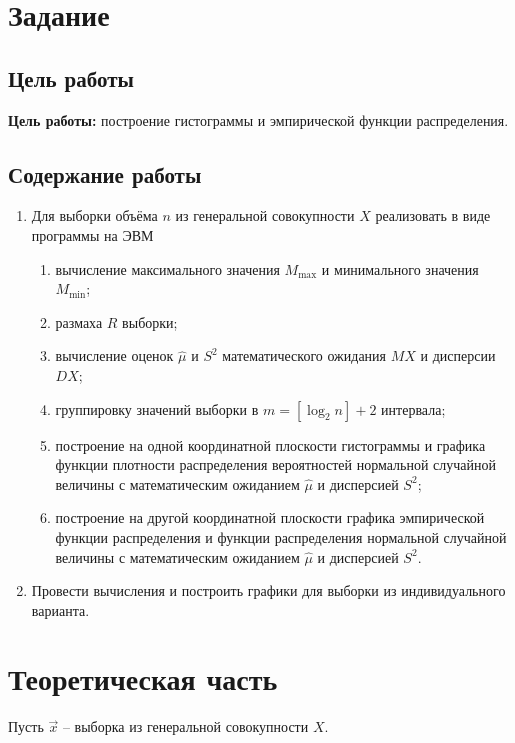 \documentclass[12pt]{report}
\begin{document}
	

	\chapter{Задание}

	\section{Цель работы}

	\textbf{Цель работы:} построение гистограммы и эмпирической функции распределения.

	\section{Содержание работы}

	\begin{enumerate}
		\item Для выборки объёма $n$ из генеральной совокупности $X$ реализовать в виде программы на ЭВМ
			\begin{enumerate}
				\item вычисление максимального значения $M_{\max}$ и минимального значения $M_{\min}$;
				\item размаха $R$ выборки;
				\item вычисление оценок $\hat\mu$ и $S^2$ математического ожидания $MX$ и дисперсии $DX$;
				\item группировку значений выборки в $m = [\log_2 n] + 2$ интервала;
				\item построение на одной координатной плоскости гистограммы и графика функции плотности распределения вероятностей нормальной случайной величины с математическим ожиданием $\hat{\mu}$ и дисперсией $S^2$;
				\item построение на другой координатной плоскости графика эмпирической функции распределения и функции распределения нормальной случайной величины с математическим ожиданием $\hat{\mu}$ и дисперсией $S^2$.
			\end{enumerate}
		\item Провести вычисления и построить графики для выборки из индивидуального варианта.
	\end{enumerate}

\chapter{Теоретическая часть}

Пусть $\vec x$ -- выборка из генеральной совокупности $X$. 
\end{document}
